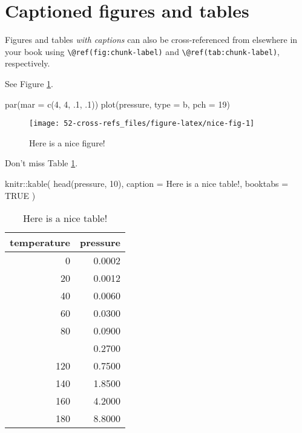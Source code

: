 \documentclass[
]{book}
\newenvironment{Shaded}{\begin{snugshade}}{\end{snugshade}}
\newcommand{\AttributeTok}[1]{\textcolor[rgb]{0.77,0.63,0.00}{#1}}
\newcommand{\ConstantTok}[1]{\textcolor[rgb]{0.00,0.00,0.00}{#1}}
\newcommand{\DecValTok}[1]{\textcolor[rgb]{0.00,0.00,0.81}{#1}}
\newcommand{\FunctionTok}[1]{\textcolor[rgb]{0.00,0.00,0.00}{#1}}
\newcommand{\NormalTok}[1]{#1}
\newcommand{\SpecialCharTok}[1]{\textcolor[rgb]{0.00,0.00,0.00}{#1}}
\newcommand{\StringTok}[1]{\textcolor[rgb]{0.31,0.60,0.02}{#1}}
\theoremstyle{definition}
\theoremstyle{definition}
\theoremstyle{definition}
\theoremstyle{definition}
\theoremstyle{remark}
\begin{document}
\hypertarget{captioned-figures-and-tables}{%
\section{Captioned figures and tables}\label{captioned-figures-and-tables}}

Figures and tables \emph{with captions} can also be cross-referenced from elsewhere in your book using \texttt{\textbackslash{}@ref(fig:chunk-label)} and \texttt{\textbackslash{}@ref(tab:chunk-label)}, respectively.

See Figure \ref{fig:nice-fig}.

\begin{Shaded}
\begin{Highlighting}[]
\FunctionTok{par}\NormalTok{(}\AttributeTok{mar =} \FunctionTok{c}\NormalTok{(}\DecValTok{4}\NormalTok{, }\DecValTok{4}\NormalTok{, .}\DecValTok{1}\NormalTok{, .}\DecValTok{1}\NormalTok{))}
\FunctionTok{plot}\NormalTok{(pressure, }\AttributeTok{type =} \StringTok{\textquotesingle{}b\textquotesingle{}}\NormalTok{, }\AttributeTok{pch =} \DecValTok{19}\NormalTok{)}
\end{Highlighting}
\end{Shaded}

\begin{figure}

{\centering \texttt{[image: 52-cross-refs\_files/figure-latex/nice-fig-1]} 

}

\caption{Here is a nice figure!}\label{fig:nice-fig}
\end{figure}

Don't miss Table \ref{tab:nice-tab}.

\begin{Shaded}
\begin{Highlighting}[]
\NormalTok{knitr}\SpecialCharTok{::}\FunctionTok{kable}\NormalTok{(}
  \FunctionTok{head}\NormalTok{(pressure, }\DecValTok{10}\NormalTok{), }\AttributeTok{caption =} \StringTok{\textquotesingle{}Here is a nice table!\textquotesingle{}}\NormalTok{,}
  \AttributeTok{booktabs =} \ConstantTok{TRUE}
\NormalTok{)}
\end{Highlighting}
\end{Shaded}

\begin{table}

\caption{\label{tab:nice-tab}Here is a nice table!}
\centering
\begin{tabular}[t]{rr}
\toprule
temperature & pressure\\
\midrule
0 & 0.0002\\
20 & 0.0012\\
40 & 0.0060\\
60 & 0.0300\\
80 & 0.0900\\
\addlinespace
100 & 0.2700\\
120 & 0.7500\\
140 & 1.8500\\
160 & 4.2000\\
180 & 8.8000\\
\bottomrule
\end{tabular}
\end{table}
\end{document}
